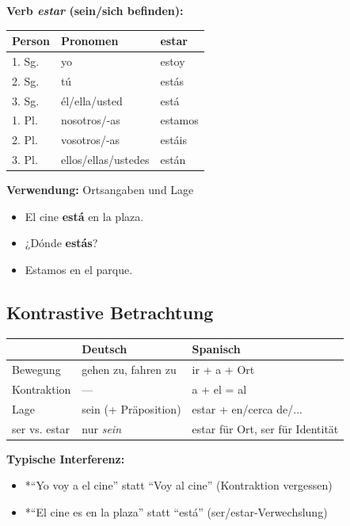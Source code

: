 \documentclass[11pt,a4paper]{article}
\begin{document}
\vspace{1em}

\textbf{Verb \textit{estar} (sein/sich befinden):}
\begin{center}
\begin{tabular}{|l|l|l|}
\hline
\textbf{Person} & \textbf{Pronomen} & \textbf{estar} \\
\hline
1. Sg. & yo & estoy \\
2. Sg. & tú & estás \\
3. Sg. & él/ella/usted & está \\
1. Pl. & nosotros/-as & estamos \\
2. Pl. & vosotros/-as & estáis \\
3. Pl. & ellos/ellas/ustedes & están \\
\hline
\end{tabular}
\end{center}

\textbf{Verwendung:} Ortsangaben und Lage
\begin{itemize}
    \item El cine \textbf{está} en la plaza.
    \item ¿Dónde \textbf{estás}?
    \item Estamos en el parque.
\end{itemize}

\subsection{Kontrastive Betrachtung}

\begin{tabular}{|l|p{5cm}|p{5cm}|}
\hline
& \textbf{Deutsch} & \textbf{Spanisch} \\
\hline
Bewegung & gehen zu, fahren zu & ir + a + Ort \\
\hline
Kontraktion & --- & a + el = al \\
\hline
Lage & sein (+ Präposition) & estar + en/cerca de/... \\
\hline
ser vs. estar & nur \textit{sein} & estar für Ort, ser für Identität \\
\hline
\end{tabular}

\textbf{Typische Interferenz:}
\begin{itemize}
    \item *``Yo voy a el cine'' statt ``Voy al cine'' (Kontraktion vergessen)
    \item *``El cine es en la plaza'' statt ``está'' (ser/estar-Verwechslung)
\end{itemize}
\end{document}
